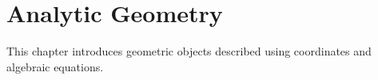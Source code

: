 \chapter{Analytic Geometry}

This chapter introduces geometric objects described using coordinates and algebraic equations.




